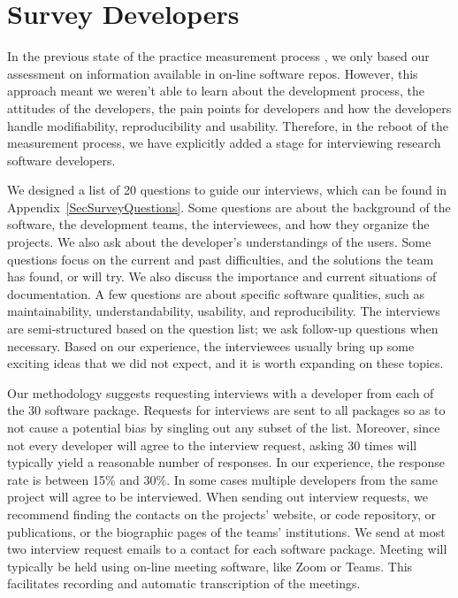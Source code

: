 \documentclass[letterpaper,cleveref]{lipics-v2019}
\begin{document}
\section{Survey Developers} \label{SecSurvey}

In the previous state of the practice measurement process
\citep{SmithEtAl2018_arXivGIS, SmithEtAl2016, SmithEtAl2018}, we only based our
assessment on information available in on-line software repos.  However, this
approach meant we weren't able to learn about the development process, the
attitudes of the developers, the pain points for developers and how the
developers handle modifiability, reproducibility and usability.  Therefore, in
the reboot of the measurement process, we have explicitly added a stage for
interviewing research software developers.

We designed a list of 20 questions to guide our interviews, which can be found
in Appendix~\ref{SecSurveyQuestions}. Some questions are about the background of
the software, the development teams, the interviewees, and how they organize the
projects. We also ask about the developer's understandings of the users. Some
questions focus on the current and past difficulties, and the solutions the team
has found, or will try. We also discuss the importance and current situations of
documentation. A few questions are about specific software qualities, such as
maintainability, understandability, usability, and reproducibility. The
interviews are semi-structured based on the question list; we ask follow-up
questions when necessary. Based on our experience, the interviewees usually
bring up some exciting ideas that we did not expect, and it is worth expanding
on these topics.

Our methodology suggests requesting interviews with a developer from each of the
30 software package.  Requests for interviews are sent to all packages so as to
not cause a potential bias by singling out any subset of the list. Moreover,
since not every developer will agree to the interview request, asking 30 times
will typically yield a reasonable number of responses. In our experience, the
response rate is between 15\% and 30\%.  In some cases multiple developers from
the same project will agree to be interviewed. When sending out interview
requests, we recommend finding the contacts on the projects’ website, or code
repository, or publications, or the biographic pages of the teams’ institutions.
We send at most two interview request emails to a contact for each software
package.  Meeting will typically be held using on-line meeting software, like
Zoom or Teams.  This facilitates recording and automatic transcription of the
meetings.
\end{document}
